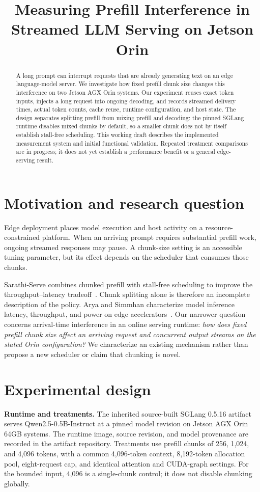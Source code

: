\documentclass[conference,10pt,letterpaper]{IEEEtran}
\title{Measuring Prefill Interference in Streamed LLM Serving on Jetson Orin}
\author{\IEEEauthorblockN{Working draft: author details pending}
\IEEEauthorblockA{Prepared for author review; not ready for submission}}
\begin{document}
\maketitle
\begin{abstract}
A long prompt can interrupt requests that are already generating text on an edge language-model server. We investigate how fixed prefill chunk size changes this interference on two Jetson AGX Orin systems. Our experiment reuses exact token inputs, injects a long request into ongoing decoding, and records streamed delivery times, actual token counts, cache reuse, runtime configuration, and host state. The design separates splitting prefill from mixing prefill and decoding: the pinned SGLang runtime disables mixed chunks by default, so a smaller chunk does not by itself establish stall-free scheduling. This working draft describes the implemented measurement system and initial functional validation. Repeated treatment comparisons are in progress; it does not yet establish a performance benefit or a general edge-serving result.
\end{abstract}

\section{Motivation and research question}
Edge deployment places model execution and host activity on a resource-constrained platform. When an arriving prompt requires substantial prefill work, ongoing streamed responses may pause. A chunk-size setting is an accessible tuning parameter, but its effect depends on the scheduler that consumes those chunks.

Sarathi-Serve combines chunked prefill with stall-free scheduling to improve the throughput--latency tradeoff~\cite{sarathi}. Chunk splitting alone is therefore an incomplete description of the policy. Arya and Simmhan characterize model inference latency, throughput, and power on edge accelerators~\cite{arya}. Our narrower question concerns arrival-time interference in an online serving runtime: \emph{how does fixed prefill chunk size affect an arriving request and concurrent output streams on the stated Orin configuration?} We characterize an existing mechanism rather than propose a new scheduler or claim that chunking is novel.

\section{Experimental design}
\textbf{Runtime and treatments.} The inherited source-built SGLang 0.5.16 artifact serves Qwen2.5-0.5B-Instruct at a pinned model revision on Jetson AGX Orin 64GB systems. The runtime image, source revision, and model provenance are recorded in the artifact repository. Treatments use prefill chunks of 256, 1,024, and 4,096 tokens, with a common 4,096-token context, 8,192-token allocation pool, eight-request cap, and identical attention and CUDA-graph settings. For the bounded input, 4,096 is a single-chunk control; it does not disable chunking globally.
\end{document}
